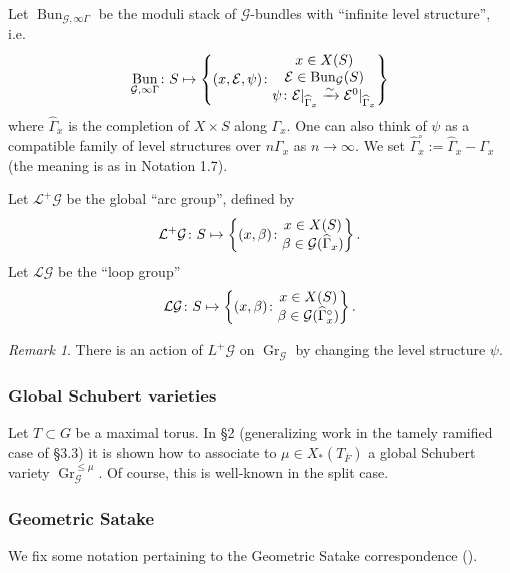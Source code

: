 \documentclass[reqno]{amsart}
\numberwithin{equation}{section}
\newcommand{\ol}[1]{\overline{#1}}
\newcommand{\wh}[1]{\widehat{#1}}
\newcommand{\Cal}[1]{\mathcal{#1}}
\newcommand{\co}{\colon}
\DeclareMathOperator{\Bun}{Bun}
\DeclareMathOperator{\Gr}{Gr}
\theoremstyle{remark}
\newtheorem{remark}[thm]{Remark}
\numberwithin{equation}{section}
\begin{document}
 Let $\Bun_{\Cal{G}, \infty \Gamma	} $ be the moduli stack of $\Cal{G}$-bundles with ``infinite level structure'', i.e. 
\[
\Bun_{\Cal{G}, \infty \Gamma } \colon S \mapsto \left\{ (x,\Cal{E}, \psi )  \colon  \begin{array}{@{}c@{}} 
  x \in X(S) \\ 
  \Cal{E} \in \Bun_{\Cal{G}}(S)  \\
\psi \colon \Cal{E}|_{ \wh{\Gamma}_x} \xrightarrow{\sim} \Cal{E}^0|_{ \wh{\Gamma}_x}
 \end{array} \right\}   
 \]
 where $\wh{\Gamma}_x$ is the completion of $X \times S$ along $\Gamma_x$. One can also think of $\psi$ as a compatible family of level structures over $ n \Gamma_x$ as $n \rightarrow \infty$. We set $\wh{\Gamma}_x^{\circ}  := \wh{\Gamma}_x - \Gamma_x$ (the meaning is as in \cite{Laff12} Notation 1.7). 
 
 Let $\Cal{L}^+ \Cal{G}$ be the global ``arc group'', defined by 
 \[
 \Cal{L}^+\Cal{G} \co S \mapsto  \left\{ (x, \beta )  \colon  \begin{array}{@{}c@{}}  
x \in X(S)  \\\beta \in \Cal{G}(\wh{\Gamma}_x)
 \end{array} \right\}    .
 \]
 Let $\Cal{L} \Cal{G}$ be the ``loop group'' 
  \[
 \Cal{L}\Cal{G} \co S \mapsto  \left\{ (x, \beta )  \colon  \begin{array}{@{}c@{}}  
x \in X(S)  \\\beta \in \Cal{G}(\wh{\Gamma}_x^{\circ})
 \end{array} \right\}    .
 \]
 
 \begin{remark}\label{rem: Gr left arc action}
 There is an action of $L^+ \Cal{G}$ on $\Gr_{\Cal{G}}$ by changing the level structure $\psi$. 
 \end{remark}


\subsubsection{Global Schubert varieties}\label{sssec: schubert Gr} Let $T \subset G$ be a maximal torus. In \cite{Rich16}	 \S 2 (generalizing work in the tamely ramified case of \cite{Zhu14} \S 3.3) it is shown how to  associate to $\mu \in X_*(T_{\ol{F}}) $ a global Schubert variety $\Gr_{\Cal{G}}^{\leq \mu}$. Of course, this is well-known in the split case. 



\subsubsection{Geometric Satake} We fix some notation pertaining to the Geometric Satake correspondence (\cite{MV07}).
\end{document}

